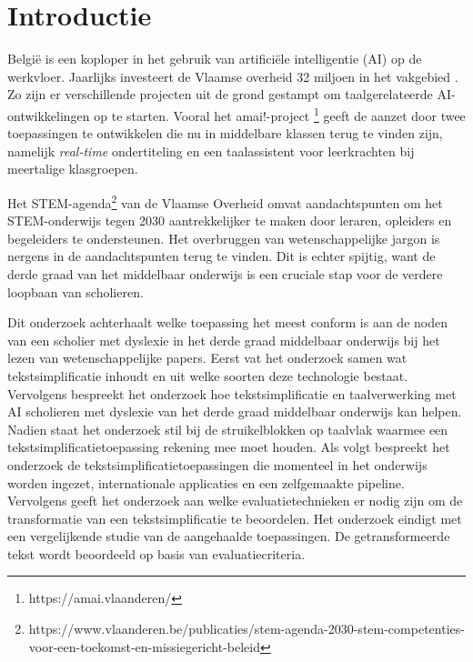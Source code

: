 
\section{Introductie}%
\label{sec:introductie}

België is een koploper in het gebruik van artificiële intelligentie (AI) op de werkvloer. Jaarlijks investeert de Vlaamse overheid 32 miljoen in het vakgebied \autocite{Crevits2022}. Zo zijn er verschillende projecten uit de grond gestampt om taalgerelateerde AI-ontwikkelingen op te starten. Vooral het amai!-project \footnote{https://amai.vlaanderen/} geeft de aanzet door twee toepassingen te ontwikkelen die nu in middelbare klassen terug te vinden zijn, namelijk \textit{real-time} ondertiteling en een taalassistent voor leerkrachten bij meertalige klasgroepen.

Het STEM-agenda\footnote{https://www.vlaanderen.be/publicaties/stem-agenda-2030-stem-competenties-voor-een-toekomst-en-missiegericht-beleid}
van de Vlaamse Overheid omvat aandachtspunten om het STEM-onderwijs tegen 2030 aantrekkelijker te maken door leraren, opleiders en begeleiders te ondersteunen. Het overbruggen van wetenschappelijke jargon is nergens in de aandachtspunten terug te vinden. Dit is echter spijtig, want de derde graad van het middelbaar onderwijs is een cruciale stap voor de verdere loopbaan van scholieren. 

Dit onderzoek achterhaalt welke toepassing het meest conform is aan de noden van een scholier met dyslexie in het derde graad middelbaar onderwijs bij het lezen van wetenschappelijke papers. Eerst vat het onderzoek samen wat tekstsimplificatie inhoudt en uit welke soorten deze technologie bestaat. Vervolgens bespreekt het onderzoek hoe tekstsimplificatie en taalverwerking met AI scholieren met dyslexie van het derde graad middelbaar onderwijs kan helpen. Nadien staat het onderzoek stil bij de struikelblokken op taalvlak waarmee een tekstsimplificatietoepassing rekening mee moet houden. Als volgt bespreekt het onderzoek de tekstsimplificatietoepassingen die momenteel in het onderwijs worden ingezet, internationale applicaties en een zelfgemaakte pipeline. Vervolgens geeft het onderzoek aan welke evaluatietechnieken er nodig zijn om de transformatie van een tekstsimplificatie te beoordelen. Het onderzoek eindigt met een vergelijkende studie van de aangehaalde toepassingen. De getransformeerde tekst wordt beoordeeld op basis van evaluatiecriteria.

